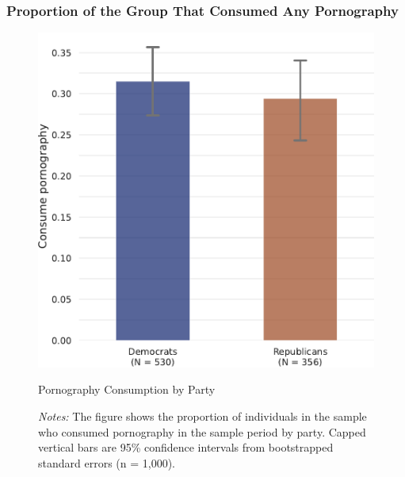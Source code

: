 \documentclass[12pt,twoside]{article}
\begin{document}
\subsubsection{Proportion of the Group That Consumed Any Pornography}
\begin{figure}[ht]
	\centering
	\includegraphics[width=.5\textwidth]{figs/consume_porn_yes_no.pdf}
	\caption{Pornography Consumption by Party}
	\caption*{\footnotesize \emph{Notes:} 
		The figure shows the proportion of individuals in the sample who consumed pornography in the sample period by party.
		Capped vertical bars are 95\% confidence intervals from bootstrapped standard errors (n = 1,000).
	}
	\label{fig:consume_porn_yes_no}
\end{figure}
\clearpage

\FloatBarrier
\end{document}
